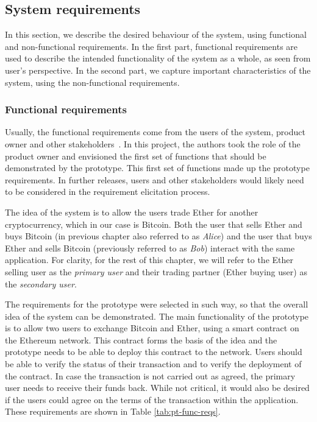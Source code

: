 \subsection{System requirements}\label{sec:system-reqs}

In this section, we describe the desired behaviour of the system, using functional and non-functional requirements. In the first part, functional requirements are used to describe the intended functionality of the system as a whole, as seen from user's perspective. In the second part, we capture important characteristics of the system, using the non-functional requirements.

\subsubsection{Functional requirements}
Usually, the functional requirements come from the users of the system, product owner and other stakeholders~\cite{Sommerville2011SoftwareEngineering}. In this project, the authors took the role of the product owner and envisioned the first set of functions that should be demonstrated by the prototype. This first set of functions made up the prototype requirements. In further releases, users and other stakeholders would likely need to be considered in the requirement elicitation process.


The idea of the system is to allow the users trade Ether for another cryptocurrency, which in our case is Bitcoin. Both the user that sells Ether and buys Bitcoin (in previous chapter also referred to as \textit{Alice}) and the user that buys Ether and sells Bitcoin (previously referred to as \textit{Bob}) interact with the same application. For clarity, for the rest of this chapter, we will refer to the Ether selling user as the \textit{primary user} and their trading partner (Ether buying user) as the \textit{secondary user}.

The requirements for the prototype were selected in such way, so that the overall idea of the system can be demonstrated. The main functionality of the prototype is to allow two users to exchange Bitcoin and Ether, using a smart contract on the Ethereum network. This contract forms the basis of the idea and the prototype needs to be able to deploy this contract to the network. Users should be able to verify the status of their transaction and to verify the deployment of the contract. In case the transaction is not carried out as agreed, the primary user needs to receive their funds back. While not critical, it would also be desired if the users could agree on the terms of the transaction within the application. These requirements are shown in Table \ref{tab:pt-func-reqs}. 

